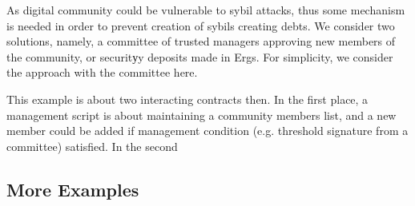  As digital community could be vulnerable to sybil attacks, thus some mechanism is needed in order to prevent creation
 of sybils creating debts. We consider two solutions, namely, a committee of trusted managers approving new members of
 the community, or securitуy deposits made in Ergs. For simplicity, we consider the approach with the committee here.

 This example is about two interacting contracts then. In the first place, a management script is about maintaining a
 community members list, and a new member could be added if management condition (e.g. threshold signature from a
 committee) satisfied. In the second

\subsection{More Examples}


